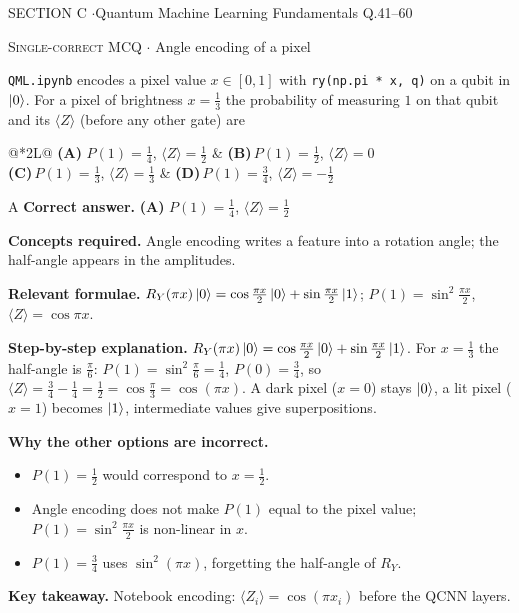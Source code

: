 \documentclass[11pt,a4paper]{article}
\newcommand{\optlabel}[1]{\textbf{(#1)}}
\newcommand{\correctlabel}[1]{\textcolor{okgreen}{\textbf{(#1)}\,\ding{51}}}
\newenvironment{qitem}[1]{\begin{list}{}{\setlength{\leftmargin}{3.3em}\setlength{\labelwidth}{3.1em}%
  \setlength{\labelsep}{0.2em}\setlength{\topsep}{3pt}\setlength{\parsep}{3pt}}\item[\textbf{Q.#1}\hfill]}{\end{list}}
\newcommand{\qsep}{\par\vspace{2pt}{\color{black!15}\hrule}\vspace{4pt}}
\newcommand{\qmeta}[2]{{\footnotesize\color{black!60}\textsc{#1} \;$\cdot$\; #2}\par}
\begin{document}
\newpage

\begin{sectionbanner}SECTION C \enspace$\cdot$\enspace Quantum Machine Learning Fundamentals \hfill Q.41--60\end{sectionbanner}

\begin{qitem}{41}
\qmeta{Single-correct MCQ}{Angle encoding of a pixel}
\texttt{QML.ipynb} encodes a pixel value $x \in [0, 1]$ with \texttt{ry(np.pi * x, q)} on a qubit in $\ket0$. For a
pixel of brightness $x = \frac13$ the probability of measuring $1$ on that qubit and its $\langle Z\rangle$ (before any other gate) are
\par\smallskip\noindent\begin{tabularx}{\linewidth}{@{}*{2}{L}@{}}
\correctlabel{A}\,$P(1) = \frac14$, $\langle Z\rangle = \frac12$ & \optlabel{B}\,$P(1) = \frac12$, $\langle Z\rangle = 0$ \\[3pt]
\optlabel{C}\,$P(1) = \frac13$, $\langle Z\rangle = \frac13$ & \optlabel{D}\,$P(1) = \frac34$, $\langle Z\rangle = -\frac12$
\end{tabularx}
\end{qitem}
\begin{solbox}{A}
\textbf{\color{brand}Correct answer.} \textcolor{okgreen}{\textbf{(A)}} $P(1) = \frac14$, $\langle Z\rangle = \frac12$

\textbf{\color{brand}Concepts required.} Angle encoding writes a feature into a rotation angle; the half-angle appears in the amplitudes.

\textbf{\color{brand}Relevant formulae.} $R_Y(\pi x)\ket0 = \cos\frac{\pi x}2\ket0 + \sin\frac{\pi x}2\ket1$; $P(1) = \sin^2\frac{\pi x}2$, $\langle Z\rangle = \cos\pi x$.

\textbf{\color{brand}Step-by-step explanation.} $R_Y(\pi x)\ket0 = \cos\frac{\pi x}{2}\ket0 + \sin\frac{\pi x}{2}\ket1$. For $x = \frac13$ the half-angle is $\frac\pi6$:
$P(1) = \sin^2\frac\pi6 = \frac14$, $P(0) = \frac34$, so $\langle Z\rangle = \frac34 - \frac14 = \frac12 = \cos\frac\pi3 = \cos(\pi x)$.
A dark pixel ($x = 0$) stays $\ket0$, a lit pixel ($x = 1$) becomes $\ket1$, intermediate values give superpositions.

\textbf{\color{brand}Why the other options are incorrect.}
\begin{itemize}[leftmargin=2.4em, itemsep=1pt, topsep=2pt]
\item[\textbf{(B)}] $P(1) = \frac12$ would correspond to $x = \frac12$.
\item[\textbf{(C)}] Angle encoding does not make $P(1)$ equal to the pixel value; $P(1) = \sin^2\frac{\pi x}{2}$ is non-linear in $x$.
\item[\textbf{(D)}] $P(1) = \frac34$ uses $\sin^2(\pi x)$, forgetting the half-angle of $R_Y$.
\end{itemize}
\textbf{\color{brand}Key takeaway.} Notebook encoding: $\langle Z_i\rangle = \cos(\pi x_i)$ before the QCNN layers.
\end{solbox}
\qsep
\end{document}
